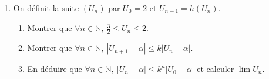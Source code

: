 \begin{exo}
\begin{description}
\begin{enumerate}
                \item On d\'efinit la suite $(U_n)$ par $U_0 = 2$ et $U_{n+1} = h(U_n)$.
                    \begin{enumerate}
                    \item Montrer que $\forall n \in \mathbb{N},\ \frac{3}{2} \leq U_n \leq 2$.
                    \item Montrer que $\forall n \in \mathbb{N} ,\ | U_{n+1} - \alpha| \leq k |U_n - \alpha|$.
                    \item En d\'eduire que $\forall n \in \mathbb{N} ,\ |U_n - \alpha| \leq k^n |U_0 - \alpha|$ et calculer $\lim U_n$.
                    \end{enumerate}
                \end{enumerate}
      \end{description}
\end{exo}
%
